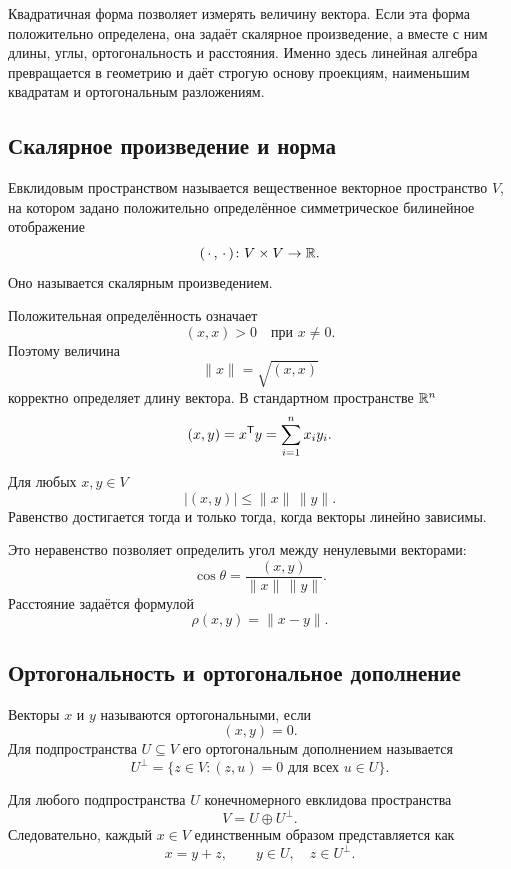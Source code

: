 Квадратичная форма позволяет измерять величину вектора. Если эта форма положительно определена, она задаёт скалярное произведение, а вместе с ним длины, углы, ортогональность и расстояния. Именно здесь линейная алгебра превращается в геометрию и даёт строгую основу проекциям, наименьшим квадратам и ортогональным разложениям.

\subsection{Скалярное произведение и норма}

\begin{definition}
Евклидовым пространством называется вещественное векторное пространство \(V\), на котором задано положительно определённое симметрическое билинейное отображение
\[
(\,\cdot\,,\,\cdot\,)\colon V\times V\to\mathbb{R}.
\]
Оно называется скалярным произведением.
\end{definition}

Положительная определённость означает
\[
(x,x)>0
\quad\text{при }x\neq0.
\]
Поэтому величина
\[
\|x\|=\sqrt{(x,x)}
\]
корректно определяет длину вектора. В стандартном пространстве \(\mathbb{R}^n\)
\[
(x,y)=x^{\mathsf{T}}y
=
\sum_{i=1}^n x_i y_i.
\]

\begin{theorem}
Для любых \(x,y\in V\)
\[
|(x,y)|\leq \|x\|\,\|y\|.
\]
Равенство достигается тогда и только тогда, когда векторы линейно зависимы.
\end{theorem}

Это неравенство позволяет определить угол между ненулевыми векторами:
\[
\cos\theta=\frac{(x,y)}{\|x\|\,\|y\|}.
\]
Расстояние задаётся формулой
\[
\rho(x,y)=\|x-y\|.
\]

\subsection{Ортогональность и ортогональное дополнение}

\begin{definition}
Векторы \(x\) и \(y\) называются ортогональными, если
\[
(x,y)=0.
\]
Для подпространства \(U\subseteq V\) его ортогональным дополнением называется
\[
U^\perp
=
\{z\in V:(z,u)=0\text{ для всех }u\in U\}.
\]
\end{definition}

\begin{theorem}
Для любого подпространства \(U\) конечномерного евклидова пространства
\[
V=U\oplus U^\perp.
\]
Следовательно, каждый \(x\in V\) единственным образом представляется как
\[
x=y+z,
\qquad
y\in U,
\quad
z\in U^\perp.
\]
\end{theorem}

